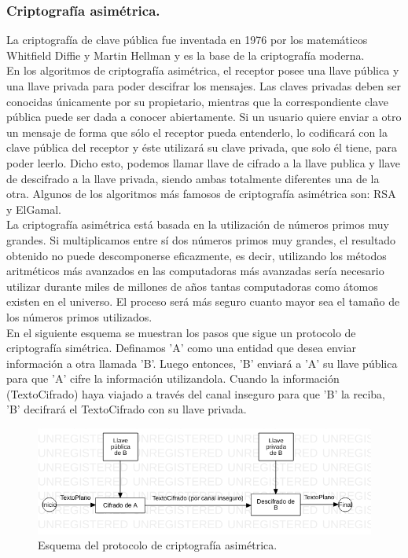 \documentclass[12pt, a4paper, titlepage]{report}
\begin{document}
        		\subsubsection{Criptografía asimétrica.}
        		La  criptografía  de  clave  pública  fue  inventada  en 1976  por  los  matemáticos  Whitfield Diffie y Martin Hellman y es la base de la criptografía moderna. \\
        		En los algoritmos de criptografía asimétrica, el receptor posee una llave pública y una llave privada para poder descifrar los mensajes. Las claves privadas deben ser conocidas únicamente por su propietario, mientras que la correspondiente clave pública puede ser dada a conocer abiertamente. Si un usuario quiere enviar a otro un mensaje de forma que sólo el receptor pueda entenderlo, lo codificará con la clave pública del receptor y éste utilizará su clave privada, que solo él tiene, para poder leerlo. Dicho esto, podemos llamar llave de cifrado a la llave publica y llave de descifrado a la llave privada, siendo ambas totalmente diferentes una de la otra. Algunos de los algoritmos más famosos de criptografía asimétrica son: RSA y ElGamal. \cite{refChaffing}\\
        		La criptografía asimétrica está basada en la utilización de números primos muy grandes. Si multiplicamos entre sí dos números primos muy grandes, el resultado obtenido no puede descomponerse eficazmente, es decir, utilizando los métodos aritméticos más avanzados en las computadoras más avanzadas sería necesario utilizar durante miles de millones de años tantas computadoras como átomos existen en el universo. El proceso será más seguro cuanto mayor sea el tamaño de los números primos utilizados.\\
        		
        		En el siguiente esquema se muestran los pasos que sigue un protocolo de criptografía simétrica. Definamos 'A' como una entidad que desea enviar información a otra llamada 'B'. Luego entonces, 'B' enviará a 'A' su llave pública para que 'A' cifre la información utilizandola. Cuando la información (TextoCifrado) haya viajado a través del canal inseguro para que 'B' la reciba, 'B' decifrará el TextoCifrado con su llave privada.
        		
        		\begin{figure}[H]
        			\begin{center}	                  \includegraphics[width=14cm]{./imagenes/MarcoTeorico/cripto_asimetrica.png}
        				\caption{Esquema del protocolo de criptografía asimétrica.}
        			\end{center}
        		\end{figure}
        		
\end{document}
